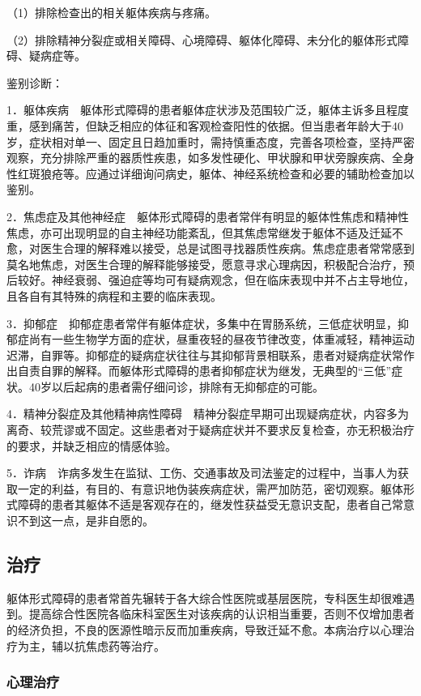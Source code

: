 （1）排除检查出的相关躯体疾病与疼痛。

（2）排除精神分裂症或相关障碍、心境障碍、躯体化障碍、未分化的躯体形式障碍、疑病症等。

鉴别诊断：

1．躯体疾病　躯体形式障碍的患者躯体症状涉及范围较广泛，躯体主诉多且程度重，感到痛苦，但缺乏相应的体征和客观检查阳性的依据。但当患者年龄大于40岁，症状相对单一、固定且日趋加重时，需持慎重态度，完善各项检查，坚持严密观察，充分排除严重的器质性疾患，如多发性硬化、甲状腺和甲状旁腺疾病、全身性红斑狼疮等。应通过详细询问病史，躯体、神经系统检查和必要的辅助检查加以鉴别。

2．焦虑症及其他神经症　躯体形式障碍的患者常伴有明显的躯体性焦虑和精神性焦虑，亦可出现明显的自主神经功能紊乱，但其焦虑常继发于躯体不适及迁延不愈，对医生合理的解释难以接受，总是试图寻找器质性疾病。焦虑症患者常常感到莫名地焦虑，对医生合理的解释能够接受，愿意寻求心理病因，积极配合治疗，预后较好。神经衰弱、强迫症等均可有疑病观念，但在临床表现中并不占主导地位，且各自有其特殊的病程和主要的临床表现。

3．抑郁症　抑郁症患者常伴有躯体症状，多集中在胃肠系统，三低症状明显，抑郁症尚有一些生物学方面的症状，昼重夜轻的昼夜节律改变，体重减轻，精神运动迟滞，自罪等。抑郁症的疑病症状往往与其抑郁背景相联系，患者对疑病症状常作出自责自罪的解释。而躯体形式障碍的患者抑郁症状为继发，无典型的“三低”症状。40岁以后起病的患者需仔细问诊，排除有无抑郁症的可能。

4．精神分裂症及其他精神病性障碍　精神分裂症早期可出现疑病症状，内容多为离奇、较荒谬或不固定。这些患者对于疑病症状并不要求反复检查，亦无积极治疗的要求，并缺乏相应的情感体验。

5．诈病　诈病多发生在监狱、工伤、交通事故及司法鉴定的过程中，当事人为获取一定的利益，有目的、有意识地伪装疾病症状，需严加防范，密切观察。躯体形式障碍的患者其躯体不适是客观存在的，继发性获益受无意识支配，患者自己常意识不到这一点，是非自愿的。

\subsection{治疗}

躯体形式障碍的患者常首先辗转于各大综合性医院或基层医院，专科医生却很难遇到。提高综合性医院各临床科室医生对该疾病的认识相当重要，否则不仅增加患者的经济负担，不良的医源性暗示反而加重疾病，导致迁延不愈。本病治疗以心理治疗为主，辅以抗焦虑药等治疗。

\subsubsection{心理治疗}

